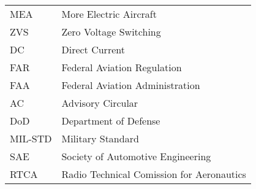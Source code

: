\begin{longtable}{ll}
MEA			&			More Electric Aircraft\\	
ZVS			&			Zero Voltage Switching\\
DC 			&			Direct Current \\
FAR			&			Federal Aviation Regulation\\
FAA			&			Federal Aviation Administration\\
AC			&			Advisory Circular\\
DoD			&			Department of Defense\\
MIL-STD		&			Military Standard\\
SAE			&			Society of Automotive Engineering\\
RTCA		&			Radio Technical Comission for Aeronautics\\
\end{longtable}

